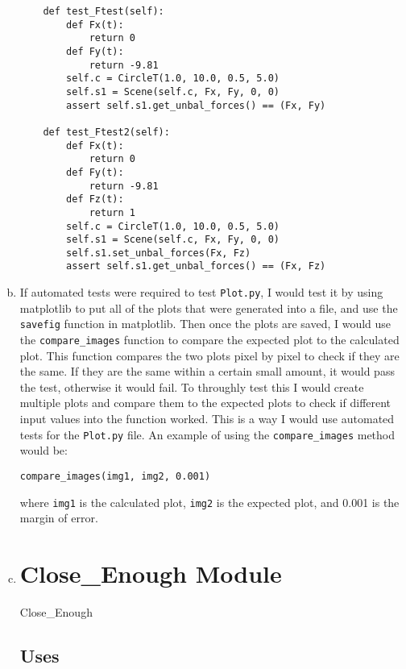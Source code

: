 \documentclass[12pt]{article}
\begin{document}
\begin{enumerate}[a)]
\begin{verbatim}
    def test_Ftest(self):
        def Fx(t):
            return 0
        def Fy(t):
            return -9.81
        self.c = CircleT(1.0, 10.0, 0.5, 5.0)
        self.s1 = Scene(self.c, Fx, Fy, 0, 0)
        assert self.s1.get_unbal_forces() == (Fx, Fy)

    def test_Ftest2(self):
        def Fx(t):
            return 0
        def Fy(t):
            return -9.81
        def Fz(t):
            return 1
        self.c = CircleT(1.0, 10.0, 0.5, 5.0)
        self.s1 = Scene(self.c, Fx, Fy, 0, 0)
        self.s1.set_unbal_forces(Fx, Fz)
        assert self.s1.get_unbal_forces() == (Fx, Fz)
\end{verbatim}

\item If automated tests were required to test \verb|Plot.py|, I would test it by using 
matplotlib to put all of the plots that were generated into a file,  and use the \verb|savefig| 
function in matplotlib. Then once the plots are saved, I would use the \verb|compare_images| 
function to compare the expected plot to the calculated plot. This function compares the two 
plots pixel by pixel to check if they are the same. If they are the same within a certain small 
amount, it would pass the test, otherwise it would fail. To throughly test this I would create 
multiple plots and compare them to the expected plots to check if different input values into the 
function worked. This is a way I would use automated tests for the \verb|Plot.py| file. An 
example of using the \verb|compare_images| method would be:

\begin{verbatim} 
compare_images(img1, img2, 0.001)
\end{verbatim} 

where \verb|img1| is the calculated plot, \verb|img2| is the expected plot, and 0.001 is the 
margin of error. 

\newpage

\item 

\section* {Close\_Enough Module}

Close\_Enough

\subsection* {Uses}


\end{enumerate}
\end{document}
